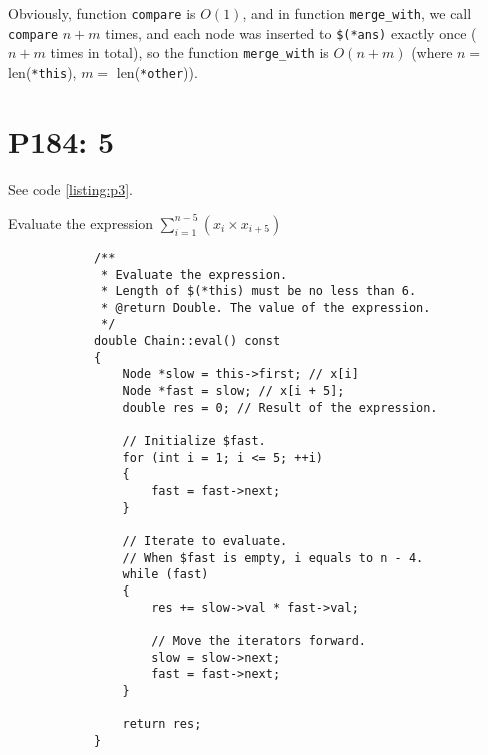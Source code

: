 \documentclass{report}
\begin{document}
    Obviously, function \verb|compare| is $O(1)$, and in function \verb|merge_with|,
    we call \verb|compare| $n + m$ times, and each node was inserted to \verb|$(*ans)|
    exactly once ($n + m$ times in total), so the function \verb|merge_with| is
    $O(n + m)$ (where $n =$ len(\verb|*this|), $m =$ len(\verb|*other|)).

    \chapter{P184: 5}

    See code \ref{listing:p3}.

    \begin{listing}[h]
        \caption{Evaluate the expression $\sum\limits_{i=1}^{n-5}(x_i \times x_{i+5})$}
        \label{listing:p3}
        \begin{verbatim}
            /**
             * Evaluate the expression.
             * Length of $(*this) must be no less than 6.
             * @return Double. The value of the expression.
             */
            double Chain::eval() const
            {
                Node *slow = this->first; // x[i]
                Node *fast = slow; // x[i + 5];
                double res = 0; // Result of the expression.

                // Initialize $fast.
                for (int i = 1; i <= 5; ++i)
                {
                    fast = fast->next;
                }

                // Iterate to evaluate.
                // When $fast is empty, i equals to n - 4.
                while (fast)
                {
                    res += slow->val * fast->val;

                    // Move the iterators forward.
                    slow = slow->next;
                    fast = fast->next;
                }

                return res;
            } 
        \end{verbatim}
    \end{listing}
    
\end{document}
